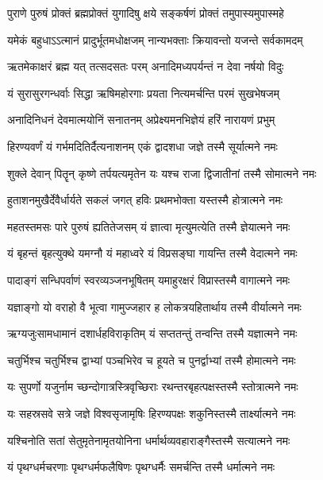 \twolineshloka
{पुराणे पुरुषं प्रोक्तं ब्रह्मप्रोक्तं युगादिषु}
{क्षये सङ्कर्षणं प्रोक्तं तमुपास्यमुपास्महे} %


\twolineshloka
{यमेकं बहुधाऽऽत्मानं प्रादुर्भूतमधोक्षजम्}
{नान्यभक्ताः क्रियावन्तो यजन्ते सर्वकामदम्} %


\twolineshloka
{ऋतमेकाक्षरं ब्रह्म यत् तत्सदसतः परम्}
{अनादिमध्यपर्यन्तं न देवा नर्षयो विदुः} %


\twolineshloka
{यं सुरासुरगन्धर्वाः सिद्धा ऋषिमहोरगाः}
{प्रयता नित्यमर्चन्ति परमं सुखभेषजम्} %


\twolineshloka
{अनादिनिधनं देवमात्मयोनिं सनातनम्}
{अप्रेक्ष्यमनभिज्ञेयं हरिं नारायणं प्रभुम्} %


\twolineshloka
{हिरण्यवर्णं यं गर्भमदितिर्दैत्यनाशनम्}
{एकं द्वादशधा जज्ञे तस्मै सूर्यात्मने नमः} %


\twolineshloka
{शुक्ले देवान् पितॄन् कृष्णे तर्पयत्यमृतेन यः}
{यश्च राजा द्विजातीनां तस्मै सोमात्मने नमः} %


\twolineshloka
{हुताशनमुखैर्देवैर्धार्यते सकलं जगत्}
{हविः प्रथमभोक्ता यस्तस्मै होत्रात्मने नमः} %


\twolineshloka
{महतस्तमसः पारे पुरुषं ह्यतितेजसम्}
{यं ज्ञात्वा मृत्युमत्येति तस्मै ज्ञेयात्मने नमः} %


\twolineshloka
{यं बृहन्तं बृहत्युक्थे यमग्नौ यं महाध्वरे}
{यं विप्रसङ्घा गायन्ति तस्मै वेदात्मने नमः} %


\twolineshloka
{पादाङ्गं सन्धिपर्वाणं स्वरव्यञ्जनभूषितम्}
{यमाहुरक्षरं विप्रास्तस्मै वागात्मने नमः} %


\twolineshloka
{यज्ञाङ्गो यो वराहो वै भूत्वा गामुज्जहार ह}
{लोकत्रयहितार्थाय तस्मै वीर्यात्मने नमः} %


\twolineshloka
{ऋग्यजुःसामधामानं दशार्धहविराकृतिम्}
{यं सप्ततन्तुं तन्वन्ति तस्मै यज्ञात्मने नमः} %


\twolineshloka
{चतुर्भिश्च चतुर्भिश्च द्वाभ्यां पञ्चभिरेव च}
{हूयते च पुनर्द्वाभ्यां तस्मै होमात्मने नमः} %


\twolineshloka
{यः सुपर्णो यजुर्नाम च्छन्दोगात्रस्त्रिवृच्छिराः}
{रथन्तरबृहत्पक्षस्तस्मै स्तोत्रात्मने नमः} %


\twolineshloka
{यः सहस्रसवे सत्रे जज्ञे विश्वसृजामृषिः}
{हिरण्यपक्षः शकुनिस्तस्मै तार्क्ष्यात्मने नमः} %


\twolineshloka
{यश्चिनोति सतां सेतुमृतेनामृतयोनिना}
{धर्मार्थव्यवहाराङ्गैस्तस्मै सत्यात्मने नमः} %


\twolineshloka
{यं पृथग्धर्मचरणाः पृथग्धर्मफलैषिणः}
{पृथग्धर्मैः समर्चन्ति तस्मै धर्मात्मने नमः} %


